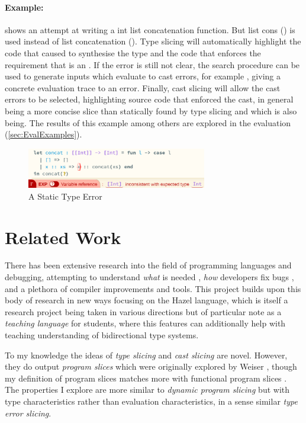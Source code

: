 \paragraph{Example:}  shows an attempt at writing a int list concatenation function. But list cons (\code{::}) is used instead of list concatenation (). Type slicing will automatically highlight the code that caused  to synthesise the \code{[Int]} type and the code that enforces the requirement that  is an . If the error is still not clear, the search procedure can be used to generate inputs which evaluate to cast errors, for example , giving a concrete evaluation trace to an error. Finally, cast slicing will allow the cast errors to be selected, highlighting source code that enforced the cast, in general being a more concise slice than statically found by type slicing and which is also being. The results of this example among others are explored in the evaluation (\cref{sec:EvalExamples}).

\begin{figure}[h]
\centering
\includegraphics[width=0.7\textwidth]{Media/Figures/concat_error}
\caption{A Static Type Error}
\label{fig:ErrorExample}
\end{figure}

\section{Related Work}
\label{sec:RelatedWork}
There has been extensive research into the field of programming languages and debugging, attempting to understand \textit{what} is needed \cite{DebugNeeds}, \textit{how} developers fix bugs \cite{HowFixBugs}, and a plethora of compiler improvements and tools. This project builds upon this body of research in new ways focusing on the Hazel language, which is itself a research project being taken in various directions but of particular note as a \textit{teaching language} \cite{HazelTutor} for students, where this features can additionally help with teaching understanding of bidirectional type systems. 

To my knowledge the ideas of \textit{type slicing} and \textit{cast slicing} are novel. However, they do output \textit{program slices} which were originally explored by Weiser \cite{ProgSlice}, though my definition of program slices matches more with functional program slices \cite{FunctionalProgExplain}.  The properties I explore are more similar to \textit{dynamic program slicing} \cite{DynProgSlice} but with type characteristics rather than evaluation characteristics, in a sense similar \textit{type error slicing}\cite{ErrSlice, HaackErrSlice}.

